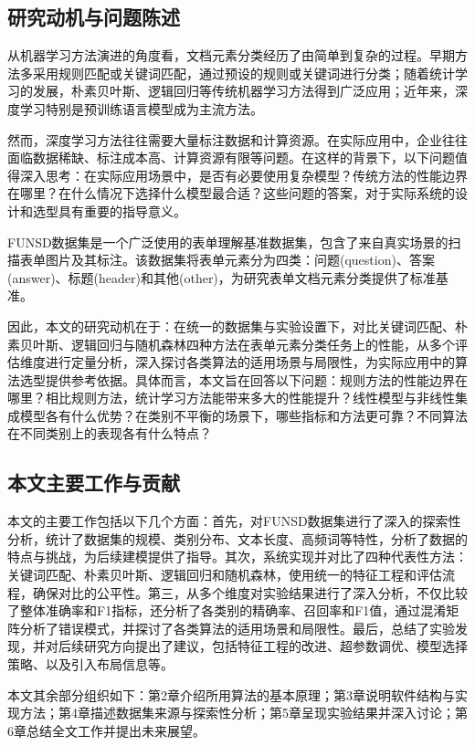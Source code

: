 \documentclass[12pt,a4paper]{article}
\begin{document}
\subsection{研究动机与问题陈述}

从机器学习方法演进的角度看，文档元素分类经历了由简单到复杂的过程。早期方法多采用规则匹配或关键词匹配，通过预设的规则或关键词进行分类；随着统计学习的发展，朴素贝叶斯、逻辑回归等传统机器学习方法得到广泛应用；近年来，深度学习特别是预训练语言模型成为主流方法。

然而，深度学习方法往往需要大量标注数据和计算资源。在实际应用中，企业往往面临数据稀缺、标注成本高、计算资源有限等问题。在这样的背景下，以下问题值得深入思考：在实际应用场景中，是否有必要使用复杂模型？传统方法的性能边界在哪里？在什么情况下选择什么模型最合适？这些问题的答案，对于实际系统的设计和选型具有重要的指导意义。

FUNSD数据集是一个广泛使用的表单理解基准数据集，包含了来自真实场景的扫描表单图片及其标注。该数据集将表单元素分为四类：问题(question)、答案(answer)、标题(header)和其他(other)，为研究表单文档元素分类提供了标准基准。

因此，本文的研究动机在于：在统一的数据集与实验设置下，对比关键词匹配、朴素贝叶斯、逻辑回归与随机森林四种方法在表单元素分类任务上的性能，从多个评估维度进行定量分析，深入探讨各类算法的适用场景与局限性，为实际应用中的算法选型提供参考依据。具体而言，本文旨在回答以下问题：规则方法的性能边界在哪里？相比规则方法，统计学习方法能带来多大的性能提升？线性模型与非线性集成模型各有什么优势？在类别不平衡的场景下，哪些指标和方法更可靠？不同算法在不同类别上的表现各有什么特点？

\subsection{本文主要工作与贡献}

本文的主要工作包括以下几个方面：首先，对FUNSD数据集进行了深入的探索性分析，统计了数据集的规模、类别分布、文本长度、高频词等特性，分析了数据的特点与挑战，为后续建模提供了指导。其次，系统实现并对比了四种代表性方法：关键词匹配、朴素贝叶斯、逻辑回归和随机森林，使用统一的特征工程和评估流程，确保对比的公平性。第三，从多个维度对实验结果进行了深入分析，不仅比较了整体准确率和F1指标，还分析了各类别的精确率、召回率和F1值，通过混淆矩阵分析了错误模式，并探讨了各类算法的适用场景和局限性。最后，总结了实验发现，并对后续研究方向提出了建议，包括特征工程的改进、超参数调优、模型选择策略、以及引入布局信息等。

本文其余部分组织如下：第2章介绍所用算法的基本原理；第3章说明软件结构与实现方法；第4章描述数据集来源与探索性分析；第5章呈现实验结果并深入讨论；第6章总结全文工作并提出未来展望。
\end{document}
